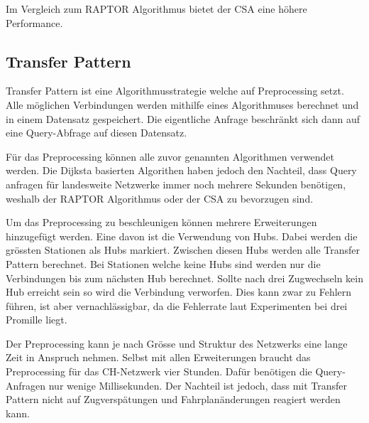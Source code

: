 Im Vergleich zum RAPTOR Algorithmus bietet der CSA eine höhere Performance. ~\cite{csa}


\subsection{Transfer Pattern}
\label{sec:Transfer Pattern}
Transfer Pattern ist eine Algorithmusstrategie welche auf Preprocessing setzt. Alle möglichen Verbindungen werden mithilfe eines Algorithmuses berechnet und in einem Datensatz gespeichert. Die eigentliche Anfrage beschränkt sich dann auf eine Query-Abfrage auf diesen Datensatz.

Für das Preprocessing können alle zuvor genannten Algorithmen verwendet werden. Die Dijksta basierten Algorithen haben jedoch den Nachteil, dass Query anfragen für landesweite Netzwerke immer noch mehrere Sekunden benötigen, weshalb der RAPTOR Algorithmus oder der CSA zu bevorzugen sind. ~\cite{transferpatterns_alenex}

Um das Preprocessing zu beschleunigen können mehrere Erweiterungen hinzugefügt werden. Eine davon ist die Verwendung von Hubs. Dabei werden die grössten Stationen als Hubs markiert. Zwischen diesen Hubs werden alle Transfer Pattern berechnet. Bei Stationen welche keine Hubs sind werden nur die Verbindungen bis zum nächsten Hub berechnet. Sollte nach drei Zugwechseln kein Hub erreicht sein so wird die Verbindung verworfen. Dies kann zwar zu Fehlern führen, ist aber vernachlässigbar, da die Fehlerrate laut Experimenten bei drei Promille liegt. ~\cite{transferpatterns_esa}

Der Preprocessing kann je nach Grösse und Struktur des Netzwerks eine lange Zeit in Anspruch nehmen. Selbst mit allen Erweiterungen braucht das Preprocessing für das CH-Netzwerk vier Stunden. Dafür benötigen die Query-Anfragen nur wenige Millisekunden. Der Nachteil ist jedoch, dass mit Transfer Pattern nicht auf Zugverspätungen und Fahrplanänderungen reagiert werden kann. 





